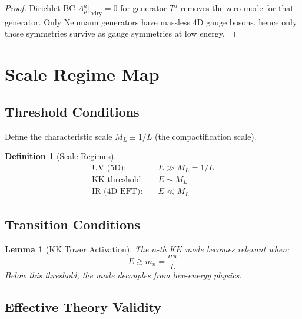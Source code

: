 \documentclass[11pt,a4paper]{article}
\newtheorem{lemma}[theorem]{Lemma}
\newtheorem{definition}[theorem]{Definition}
\begin{document}
\begin{proof}
Dirichlet BC $A_\mu^a|_{\text{bdry}} = 0$ for generator $T^a$ removes the zero
mode for that generator. Only Neumann generators have massless 4D gauge bosons,
hence only those symmetries survive as gauge symmetries at low energy.
\end{proof}

\section{Scale Regime Map}
\label{sec:scale-map}

\subsection{Threshold Conditions}

Define the characteristic scale $M_L \equiv 1/L$ (the compactification scale).

\begin{definition}[Scale Regimes]
\begin{align}
  \text{UV (5D):} & \quad E \gg M_L = 1/L
  \label{eq:uv-regime} \\
  \text{KK threshold:} & \quad E \sim M_L
  \label{eq:kk-threshold} \\
  \text{IR (4D EFT):} & \quad E \ll M_L
  \label{eq:ir-regime}
\end{align}
\end{definition}

\subsection{Transition Conditions}

\begin{lemma}[KK Tower Activation]
\label{lem:kk-activation}
The $n$-th KK mode becomes relevant when:
\begin{equation}
  E \gtrsim m_n = \frac{n\pi}{L}
  \label{eq:kk-activation}
\end{equation}
Below this threshold, the mode decouples from low-energy physics.
\end{lemma}

\subsection{Effective Theory Validity}
\end{document}
